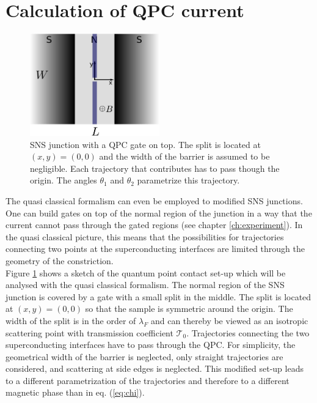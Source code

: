 \section{Calculation of QPC current}
\begin{figure}
\centering
\includegraphics[width=0.5\textwidth]{figure/analyticalmodel/qpc_sns_junction}
\caption{SNS junction with a QPC gate on top. The split is located at $(x, y) = (0, 0)$ and the width of the barrier is assumed to be negligible. Each trajectory that contributes has to pass though the origin. The angles $\theta_1$ and $\theta_2$ parametrize this trajectory.}
\label{fig:qpc_sns_schematic}
\end{figure}
The quasi classical formalism can even be employed to modified SNS junctions. One can build gates on top of the normal region of the junction in a way that the current cannot pass through the gated regions (see chapter \ref{ch:experiment}). In the quasi classical picture, this means that the possibilities for trajectories connecting two points at the superconducting interfaces are limited through the geometry of the constriction.\\
Figure \ref{fig:qpc_sns_schematic} shows a sketch of the quantum point contact set-up which will be analysed with the quasi classical formalism. The normal region of the SNS junction is covered by a gate with a small split in the middle. The split is located at $(x, y) = (0, 0)$ so that the sample is symmetric around the origin. The width of the split is in the order of $\lambda_F$  and can thereby be viewed as an isotropic scattering point with transmission coefficient $\mathcal{T}_0$. Trajectories connecting the two superconducting interfaces have to pass through the QPC. For simplicity, the geometrical width of the barrier is neglected, only straight trajectories are considered, and scattering at side edges is neglected. This modified set-up leads to a different parametrization of the trajectories and therefore to a different magnetic phase than in eq. (\ref{eq:chi}).\\
